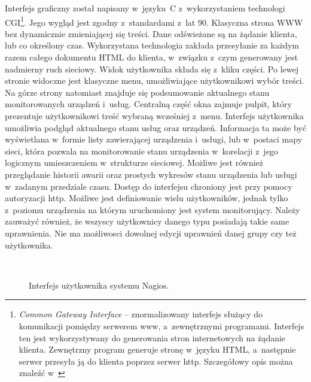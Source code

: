 Interfejs graficzny został napisany w~języku~C z~wykorzystaniem
technologi CGI\footnote{{\em Common Gateway Interface} --
  znormalizowany interfejs służący do komunikacji pomiędzy serwerem
  www, a~zewnętrznymi programami. Interfejs ten jest wykorzystywany do
  generowania stron internetowych na żądanie klienta. Zewnętrzny
  program generuje stronę w~języku HTML, a~następnie serwer przesyła
  ją do klienta poprzez serwer http. Szczegółowy opis można znaleźć
  w~\cite{www:CGI}}. Jego wygląd jest zgodny z~standardami z~lat
90. Klasyczna strona WWW bez dynamicznie zmieniającej się treści. Dane
odświeżane są na żądanie klienta, lub co określony czas. Wykorzystana
technologia zakłada przesyłanie za każdym razem całego dokumentu HTML
do klienta, w~związku z~czym generowany jest nadmierny ruch
sieciowy. Widok użytkownika składa się z~kliku części. Po lewej
stronie widoczne jest klasyczne menu, umożliwiające użytkownikowi
wybór treści. Na górze strony natomiast znajduje się podsumowanie
aktualnego stanu monitorowanych urządzeń i~usług. Centralną część okna
zajmuje pulpit, który prezentuje użytkownikowi treść wybraną wcześniej
z~menu. Interfejs użytkownika umożliwia podgląd aktualnego stanu usług
oraz urządzeń. Informacja ta może być wyświetlana w~formie listy
zawierającej urządzenia i~usługi, lub w~postaci mapy sieci, która
pozwala na monitorowanie stanu urządzenia w~korelacji z~jego logicznym
umieszczeniem w~strukturze sieciowej. Możliwe jest również
przeglądanie historii awarii oraz prostych wykresów stanu urządzenia
lub usługi w~zadanym przedziale czasu. Dostęp do interfejsu chroniony
jest przy pomocy autoryzacji http. Możliwe jest definiowanie wielu
użytkowników, jednak tylko z~poziomu urządzenia na którym uruchomiony
jest system monitorujący. Należy zauważyć również, że wszyscy
użytkownicy danego typu posiadają takie same uprawnienia. Nie ma
możliwosci dowolnej edycji uprawnień danej grupy czy też użytkownika.

\begin{figure}[h]
\label{fig:NagiosInterface}
\caption{Interfejs użytkownika systemu Nagios.}
\begin{center}
\\[0.1cm]
\end{center}
\end{figure}

